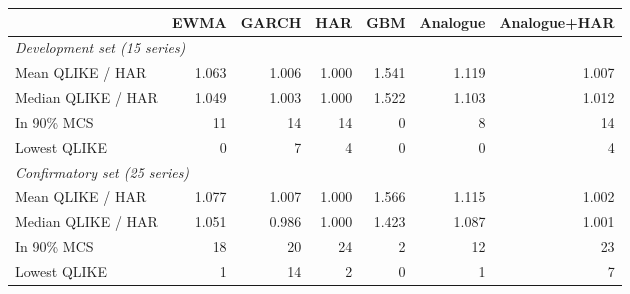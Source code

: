 \begin{tabular}{lrrrrrr}
\toprule
& EWMA & GARCH & HAR & GBM & Analogue & Analogue+HAR \\
\midrule
\multicolumn{7}{l}{\textit{Development set (15 series)}}\\
Mean QLIKE / HAR & 1.063 & 1.006 & 1.000 & 1.541 & 1.119 & 1.007\\
Median QLIKE / HAR & 1.049 & 1.003 & 1.000 & 1.522 & 1.103 & 1.012\\
In 90\% MCS & 11 & 14 & 14 & 0 & 8 & 14\\
Lowest QLIKE & 0 & 7 & 4 & 0 & 0 & 4\\
\midrule
\multicolumn{7}{l}{\textit{Confirmatory set (25 series)}}\\
Mean QLIKE / HAR & 1.077 & 1.007 & 1.000 & 1.566 & 1.115 & 1.002\\
Median QLIKE / HAR & 1.051 & 0.986 & 1.000 & 1.423 & 1.087 & 1.001\\
In 90\% MCS & 18 & 20 & 24 & 2 & 12 & 23\\
Lowest QLIKE & 1 & 14 & 2 & 0 & 1 & 7\\
\bottomrule
\end{tabular}
